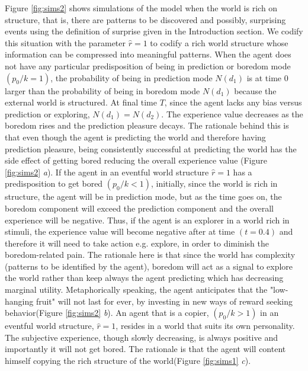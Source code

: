\documentclass[11pt, onecolumn]{article}
\begin{document}
Figure \ref{fig:sims2} shows simulations of the model when the world is rich on structure, that is, there are patterns to be discovered and possibly, surprising events using the definition of surprise given in the Introduction section. We codify this situation with the parameter $\hat{r} = 1$ to codify a rich world structure whose information can be compressed into meaningful patterns.
When the agent does not have any particular predisposition of being in prediction or boredom mode $(p_0/k =1)$, the probability of being in prediction mode $N(d_1)$ is at time 0 larger than the probability of being in boredom mode $N(d_1)$ because the external world is structured. At final time $T$, since the agent lacks any bias versus prediction or exploring, $N(d_1) = N(d_2)$. The experience value decreases as the boredom rises and the prediction pleasure decays. The rationale behind this is that even though the agent is predicting the world and therefore having prediction pleasure, being consistently successful at predicting the world has the side effect of getting bored reducing the overall experience value (Figure \ref{fig:sims2} \emph{a}). %
If the agent in an eventful world structure $\hat{r} = 1$ has a predisposition to get bored $(p_0/k < 1)$, initially, since the world is rich in structure, the agent will be in prediction mode, but as the time goes on, the boredom component will exceed the prediction component and the overall experience will be negative. Thus, if the agent is an explorer in a world rich in stimuli, the experience value will become negative after at time $(t = 0.4)$ and therefore it will need to take action e.g. explore, in order to diminish the boredom-related pain. The rationale here is that since the world has complexity (patterns to be identified by the agent), boredom will act as a signal to explore the world rather than keep always the agent predicting which has decreasing marginal utility. Metaphorically speaking, the agent anticipates that the "low-hanging fruit" will not last for ever, by investing in new ways of reward seeking behavior(Figure \ref{fig:sims2} \emph{b}). %
An agent that is a copier, $(p_0/k >1)$ in an eventful world structure, $\hat{r} = 1$, resides in a world that suits its own personality. The subjective experience, though slowly decreasing, is always positive and importantly it will not get bored. The rationale is that the agent will content himself copying the rich structure of the world(Figure \ref{fig:sims1} \emph{c}). %
\end{document}
